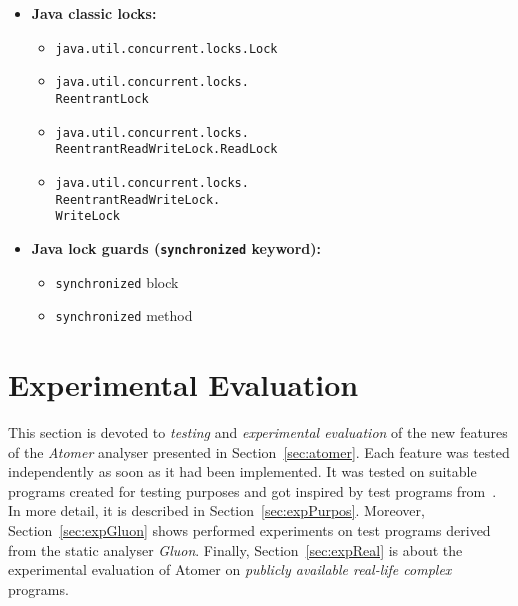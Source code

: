 \begin{itemize}
    \item
        \textbf{Java classic locks:}
        \begin{itemize}
            \item \texttt{java.util.concurrent.locks.Lock}
            \item \texttt{java.util.concurrent.locks.\\ReentrantLock}
            \item \texttt{java.util.concurrent.locks.\\%
                ReentrantReadWriteLock.ReadLock}
            \item \texttt{java.util.concurrent.locks.\\%
                ReentrantReadWriteLock.\\WriteLock}
        \end{itemize}

    \item
        \textbf{Java lock guards (\texttt{synchronized} keyword):}
        \begin{itemize}
            \item \texttt{synchronized} block
            \item \texttt{synchronized} method
        \end{itemize}
\end{itemize}


\section{Experimental Evaluation}
\label{sec:exp}

This section is devoted to \emph{testing} and \emph{experimental evaluation}
of the new features of the \emph{Atomer} analyser presented in
Section~\ref{sec:atomer}. Each feature was tested independently as soon as it
had been implemented. It was tested on suitable programs created for testing
purposes and got inspired by test programs from~\cite{harmimBP}. In more
detail, it is described in Section~\ref{sec:expPurpos}. Moreover,
Section~\ref{sec:expGluon} shows performed experiments on test programs
derived from the static analyser \emph{Gluon}. Finally,
Section~\ref{sec:expReal} is about the experimental evaluation of Atomer on
\emph{publicly available real-life complex} programs.

